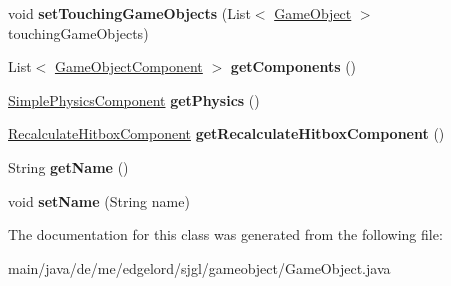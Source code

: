 \begin{DoxyCompactItemize}
\item 
\mbox{\label{classde_1_1me_1_1edgelord_1_1sjgl_1_1gameobject_1_1_game_object_a3433057c07896876674379d74c629a8e}} 
void {\bfseries set\+Touching\+Game\+Objects} (List$<$ \mbox{\hyperlink{classde_1_1me_1_1edgelord_1_1sjgl_1_1gameobject_1_1_game_object}{Game\+Object}} $>$ touching\+Game\+Objects)
\item 
\mbox{\label{classde_1_1me_1_1edgelord_1_1sjgl_1_1gameobject_1_1_game_object_a5b74e6a06d850004b4a153b1d5838c53}} 
List$<$ \mbox{\hyperlink{classde_1_1me_1_1edgelord_1_1sjgl_1_1gameobject_1_1_game_object_component}{Game\+Object\+Component}} $>$ {\bfseries get\+Components} ()
\item 
\mbox{\label{classde_1_1me_1_1edgelord_1_1sjgl_1_1gameobject_1_1_game_object_ac943a6d1be86e4381333cd0f7237353d}} 
\mbox{\hyperlink{classde_1_1me_1_1edgelord_1_1sjgl_1_1gameobject_1_1components_1_1_simple_physics_component}{Simple\+Physics\+Component}} {\bfseries get\+Physics} ()
\item 
\mbox{\label{classde_1_1me_1_1edgelord_1_1sjgl_1_1gameobject_1_1_game_object_a7b7d822e981cedc42e979041e70d9cd5}} 
\mbox{\hyperlink{classde_1_1me_1_1edgelord_1_1sjgl_1_1gameobject_1_1components_1_1_recalculate_hitbox_component}{Recalculate\+Hitbox\+Component}} {\bfseries get\+Recalculate\+Hitbox\+Component} ()
\item 
\mbox{\label{classde_1_1me_1_1edgelord_1_1sjgl_1_1gameobject_1_1_game_object_a47d015acbbdf269d2fc09be07deaf22c}} 
String {\bfseries get\+Name} ()
\item 
\mbox{\label{classde_1_1me_1_1edgelord_1_1sjgl_1_1gameobject_1_1_game_object_a990aa5133444fe6eef67c26fb8ea80d9}} 
void {\bfseries set\+Name} (String name)
\end{DoxyCompactItemize}


The documentation for this class was generated from the following file\+:\begin{DoxyCompactItemize}
\item 
main/java/de/me/edgelord/sjgl/gameobject/Game\+Object.\+java\end{DoxyCompactItemize}
